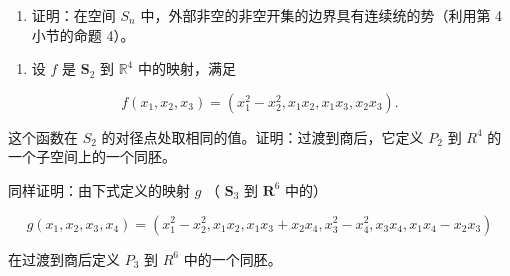 \begin{enumerate}
\def\labelenumi{\arabic{enumi})}
\setcounter{enumi}{12}
\tightlist
\item
  证明：在空间 \(S_{n}\) 中，外部非空的非空开集的边界具有连续统的势（利用第 4 小节的命题 4）。
\end{enumerate}

\ExerciseSection

\begin{enumerate}
\def\labelenumi{\arabic{enumi})}
\tightlist
\item
  设 \(f\) 是 \(\mathbf{S}_2\) 到 \(\mathbb{R}^4\) 中的映射，满足
\end{enumerate}

\[
f \left(x _ {1}, x _ {2}, x _ {3}\right) = \left(x _ {1} ^ {2} - x _ {2} ^ {2}, x _ {1} x _ {2}, x _ {1} x _ {3}, x _ {2} x _ {3}\right).
\]

这个函数在 \(S_{2}\) 的对径点处取相同的值。证明：过渡到商后，它定义 \(P_{2}\) 到 \(R^{4}\) 的一个子空间上的一个同胚。

同样证明：由下式定义的映射 \(g\) （ \(\mathbf{S}_3\) 到 \(\mathbf{R}^6\) 中的）

\[
g \left(x _ {1}, x _ {2}, x _ {3}, x _ {4}\right) = \left(x _ {1} ^ {2} - x _ {2} ^ {2}, x _ {1} x _ {2}, x _ {1} x _ {3} + x _ {2} x _ {4}, x _ {3} ^ {2} - x _ {4} ^ {2}, x _ {3} x _ {4}, x _ {1} x _ {4} - x _ {2} x _ {3}\right)
\]

在过渡到商后定义 \(P_{3}\) 到 \(R^{6}\) 中的一个同胚。

